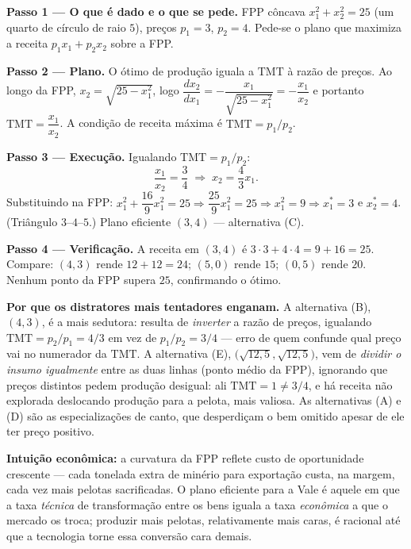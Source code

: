\begin{solucao}
\textbf{Passo 1 --- O que é dado e o que se pede.} FPP côncava $x_1^2+x_2^2=25$ (um quarto de círculo de raio $5$), preços $p_1=3$, $p_2=4$. Pede-se o plano que maximiza a receita $p_1 x_1 + p_2 x_2$ sobre a FPP.

\textbf{Passo 2 --- Plano.} O ótimo de produção iguala a $\text{TMT}$ à razão de preços. Ao longo da FPP, $x_2 = \sqrt{25 - x_1^2}$, logo $\dfrac{dx_2}{dx_1} = -\dfrac{x_1}{\sqrt{25-x_1^2}} = -\dfrac{x_1}{x_2}$ e portanto $\text{TMT} = \dfrac{x_1}{x_2}$. A condição de receita máxima é $\text{TMT}=p_1/p_2$.

\textbf{Passo 3 --- Execução.} Igualando $\text{TMT}=p_1/p_2$:
\[ \frac{x_1}{x_2} = \frac{3}{4} \;\Longrightarrow\; x_2 = \frac{4}{3}x_1. \]
Substituindo na FPP: $x_1^2 + \dfrac{16}{9}x_1^2 = 25 \Rightarrow \dfrac{25}{9}x_1^2 = 25 \Rightarrow x_1^2 = 9 \Rightarrow x_1^{*} = 3$ e $x_2^{*} = 4$. (Triângulo $3$--$4$--$5$.) Plano eficiente $(3,4)$ --- alternativa (C).

\textbf{Passo 4 --- Verificação.} A receita em $(3,4)$ é $3\cdot 3 + 4\cdot 4 = 9 + 16 = 25$. Compare: $(4,3)$ rende $12+12 = 24$; $(5,0)$ rende $15$; $(0,5)$ rende $20$. Nenhum ponto da FPP supera $25$, confirmando o ótimo.

\textbf{Por que os distratores mais tentadores enganam.} A alternativa (B), $(4,3)$, é a mais sedutora: resulta de \emph{inverter} a razão de preços, igualando $\text{TMT}=p_2/p_1=4/3$ em vez de $p_1/p_2=3/4$ --- erro de quem confunde qual preço vai no numerador da $\text{TMT}$. A alternativa (E), $\big(\sqrt{12{,}5},\sqrt{12{,}5}\big)$, vem de \emph{dividir o insumo igualmente} entre as duas linhas (ponto médio da FPP), ignorando que preços distintos pedem produção desigual: ali $\text{TMT}=1\neq 3/4$, e há receita não explorada deslocando produção para a pelota, mais valiosa. As alternativas (A) e (D) são as especializações de canto, que desperdiçam o bem omitido apesar de ele ter preço positivo.

\textbf{Intuição econômica:} a curvatura da FPP reflete custo de oportunidade crescente --- cada tonelada extra de minério para exportação custa, na margem, cada vez mais pelotas sacrificadas. O plano eficiente para a Vale é aquele em que a taxa \emph{técnica} de transformação entre os bens iguala a taxa \emph{econômica} a que o mercado os troca; produzir mais pelotas, relativamente mais caras, é racional até que a tecnologia torne essa conversão cara demais.
\end{solucao}

